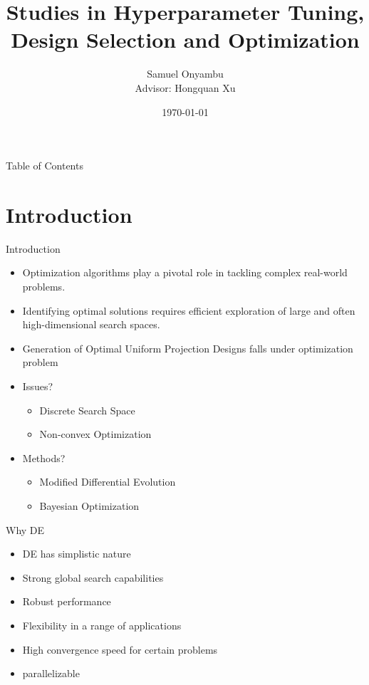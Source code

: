\documentclass{beamer}
\title[]
{Studies in Hyperparameter Tuning, Design Selection and Optimization}
\subtitle{}
\author[Onyambu, S.] {Samuel Onyambu\\
          Advisor: Hongquan Xu}
\institute[UCLA] %
{

 Department of Statistics\\
 UCLA

}
\date[]{\today} %
\begin{document}
\frame{\titlepage}

\begin{frame}{Table of Contents}
   \tableofcontents
\end{frame}


\section{Introduction}
\begin{frame}{Introduction}
\begin{itemize}
  \item Optimization algorithms play a pivotal role in tackling complex real-world problems.
  \item Identifying optimal solutions requires efficient exploration of large and often high-dimensional search spaces.
  \item Generation of Optimal Uniform Projection Designs falls under optimization problem
  \item Issues?
  \begin{itemize}
    \item Discrete Search Space
    \item Non-convex Optimization
  \end{itemize}
  \item Methods?
  \begin{itemize}
    \item Modified Differential Evolution
    \item Bayesian Optimization
  \end{itemize}
\end{itemize}
\end{frame}
\begin{frame}{Why DE}
\begin{itemize}
  \item DE has simplistic nature
  \item Strong global search capabilities
  \item Robust performance
  \item Flexibility in a range of applications
  \item High convergence speed for certain problems
  \item parallelizable
\end{itemize}
\end{frame}
\end{document}
